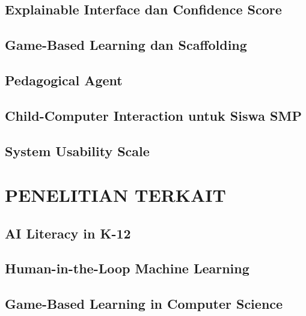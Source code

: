 \documentclass[12pt,a4paper,oneside,openany]{report}
\begin{document}
\subsection{Explainable Interface dan Confidence Score}
\label{subsec:xai-confidence}

\subsection{Game-Based Learning dan Scaffolding}
\label{subsec:gbl-scaffolding}

\subsection{Pedagogical Agent}
\label{subsec:pedagogical-agent}

\subsection{Child-Computer Interaction untuk Siswa SMP}
\label{subsec:cci}

\subsection{System Usability Scale}
\label{subsec:sus}

\section{PENELITIAN TERKAIT}
\label{sec:penelitian-terkait}

\subsection{AI Literacy in K-12}
\label{subsec:penelitian-1}

\subsection{Human-in-the-Loop Machine Learning}
\label{subsec:penelitian-2}

\subsection{Game-Based Learning in Computer Science}
\label{subsec:penelitian-3}
\end{document}
